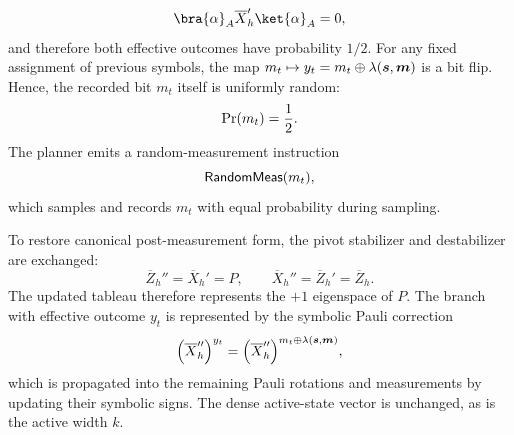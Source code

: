 \documentclass[a4paper,onecolumn,unpublished]{quantumarticle}
\DeclarePairedDelimiter\rbra{\lparen}{\rparen}
\newcommand{\iFont}[1]{\textsf{#1}}
\newcommand{\iRandomMeas}{\iFont{RandomMeas}}
\begin{document}
\begin{equation*}
    \bra{\alpha}_{A} \overline{X}_{h}' \ket{\alpha}_A = 0,
\end{equation*}
and therefore both effective outcomes have probability $1/2$.
For any fixed assignment of previous symbols, the map $m_t \mapsto y_t = m_t\oplus \lambda\rbra{\bm{s},\bm{m}}$ is a bit flip.
Hence, the recorded bit $m_t$ itself is uniformly random:
\begin{equation*}
    \Pr\rbra{m_t} = \frac{1}{2}.
\end{equation*}
The planner emits a random-measurement instruction
\begin{equation*}
    \iRandomMeas\rbra{m_t},
\end{equation*}
which samples and records $m_t$ with equal probability during sampling.

To restore canonical post-measurement form, the pivot stabilizer and destabilizer are exchanged:
\begin{equation*}
    \overline{Z}_{h}'' = \overline{X}_{h}' = P, \qquad \overline{X}_{h}'' = \overline{Z}_{h}' = \overline{Z}_h.
\end{equation*}
The updated tableau therefore represents the $+1$ eigenspace of $P$.
The branch with effective outcome $y_t$ is represented by the symbolic Pauli correction
\begin{equation*}
    \rbra*{\overline{X}_h''}^{y_t} = \rbra*{\overline{X}_h''}^{m_t\oplus \lambda\rbra{\bm{s},\bm{m}}},
\end{equation*}
which is propagated into the remaining Pauli rotations and measurements by updating their symbolic signs.
The dense active-state vector is unchanged, as is the active width $k$.
\end{document}

